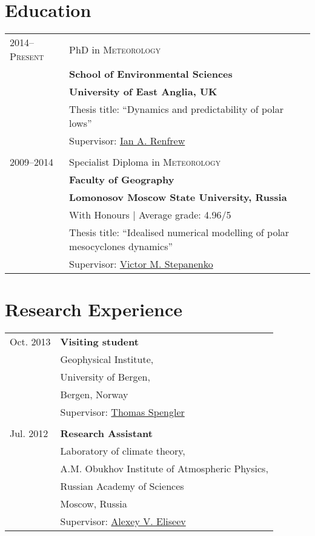 \documentclass[a4paper,10pt]{article}
\newlength{\mycol}
\begin{document}
\section{Education}
\begin{tabu} to 
 \textsc{2014--\small{Present}} & PhD in \textsc{Meteorology}\\
& \textbf{School of Environmental Sciences} \\
& \textbf{University of East Anglia, UK} \\
& Thesis title: ``Dynamics and predictability of polar lows'' \\
& Supervisor: \href{mailto:I.Renfrew@uea.ac.uk}{Ian A. Renfrew} \\
 \\
 \textsc{2009--2014} & Specialist Diploma in \textsc{Meteorology}\\
& \textbf{Faculty of Geography} \\
& \textbf{Lomonosov Moscow State University, Russia} \\
& With Honours \hfill | Average grade: 4.96/5 
\\ %
& Thesis title: ``Idealised numerical modelling of polar mesocyclones dynamics'' \\
& Supervisor: \href{mailto:stepanen@srcc.msu.ru}{Victor M. Stepanenko}
\end{tabu}

\section{Research Experience}
\begin{tabu} to 
 {\small Oct.} 2013 & \textbf{Visiting student} \\
& Geophysical Institute, \\
& University of Bergen, \\
& Bergen, Norway \\
& Supervisor: \href{mailto:thomas.spengler@gfi.uib.no}{Thomas Spengler}\\
 \\
{\small Jul.} 2012 & \textbf{Research Assistant} \\
& Laboratory of climate theory, \\
& A.M. Obukhov Institute of Atmospheric Physics, \\
& Russian Academy of Sciences \\
& Moscow, Russia \\
& Supervisor: \href{mailto:eliseev@ifaran.ru}{Alexey V. Eliseev}\\
\end{tabu}
\end{document}
